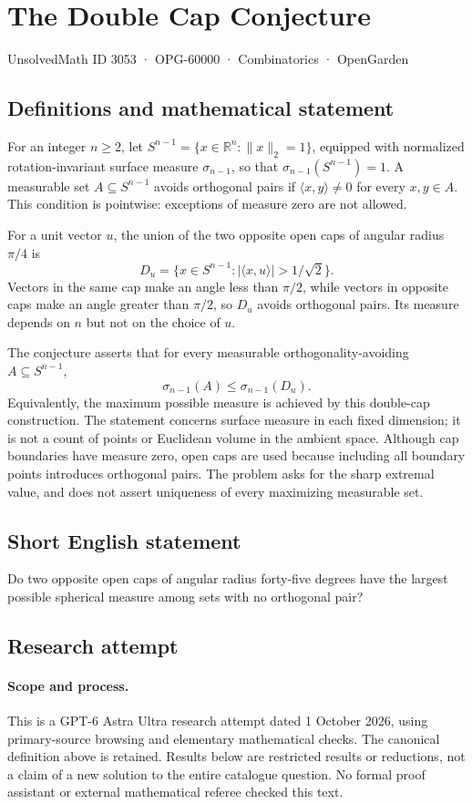 \documentclass[11pt,a4paper]{article}
\begin{document}
\section*{The Double Cap Conjecture}\label{3053}
{\small UnsolvedMath ID 3053 · OPG-60000 · Combinatorics · OpenGarden}
\subsection{Definitions and mathematical statement}
For an integer $n\ge2$, let
$S^{n-1}=\{x\in\mathbb R^n:\|x\|_2=1\}$, equipped with normalized
rotation-invariant surface measure $\sigma_{n-1}$, so that
$\sigma_{n-1}(S^{n-1})=1$. A measurable set $A\subseteq S^{n-1}$ avoids
orthogonal pairs if $\langle x,y\rangle\ne0$ for every $x,y\in A$.
This condition is pointwise: exceptions of measure zero are not allowed.

For a unit vector $u$, the union of the two opposite open caps of angular
radius $\pi/4$ is
\[
 D_u=\{x\in S^{n-1}:|\langle x,u\rangle|>1/\sqrt2\}.
\]
Vectors in the same cap make an angle less than $\pi/2$, while vectors
in opposite caps make an angle greater than $\pi/2$, so $D_u$ avoids
orthogonal pairs. Its measure depends on $n$ but not on the choice of $u$.

The conjecture asserts that for every measurable orthogonality-avoiding
$A\subseteq S^{n-1}$,
\[
 \sigma_{n-1}(A)\le\sigma_{n-1}(D_u).
\]
Equivalently, the maximum possible measure is achieved by this double-cap
construction. The statement concerns surface measure in each fixed
dimension; it is not a count of points or Euclidean volume in the ambient
space. Although cap boundaries have measure zero, open caps are used because
including all boundary points introduces orthogonal pairs. The problem
asks for the sharp extremal value, and does not assert uniqueness of every
maximizing measurable set.
\subsection{Short English statement}
Do two opposite open caps of angular radius forty-five degrees have the largest possible spherical measure among sets with no orthogonal pair?
\subsection{Research attempt}
\paragraph{Scope and process.}
This is a GPT-6 Astra Ultra research attempt dated 1 October 2026, using
primary-source browsing and elementary mathematical checks. The canonical
definition above is retained. Results below are restricted results or
reductions, not a claim of a new solution to the entire catalogue question.
No formal proof assistant or external mathematical referee checked this text.
\end{document}
